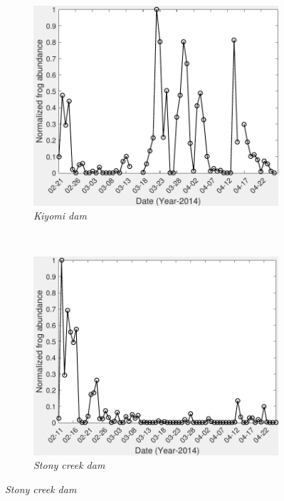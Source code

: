 \begin{figure}[htb!]
\centering
        \begin{subfigure}[b]{0.3\textwidth}
                \includegraphics[width=\textwidth]{image/Ch7/abundance1075.pdf}
                \caption{\textit{Kiyomi dam}}
        \end{subfigure}
       ~
              \begin{subfigure}[b]{0.3\textwidth}
                \includegraphics[width=\textwidth]{image/Ch7/abundance1078.pdf}     
                \caption{\textit{Stony creek dam}}           
        \end{subfigure} 

\end{figure}
